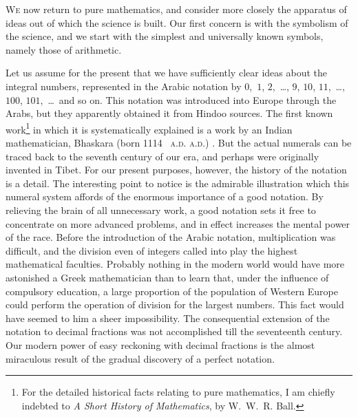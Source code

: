 \documentclass[12pt,leqno]{book}[2005/09/16]
\makeatletter
\newcommand{\Chg}[2]{#2}
\newcommand{\Add}[1]{\Chg{}{#1}}
\newcommand{\PageSep}[1]{\ignorespaces}
\newcommand{\First}[1]{\textsc{#1}}
\newcommand{\Title}[1]{\textit{#1}}
\newcommand{\SCAbbrev}[3]{%
  \ifthenelse{\equal{#3}{.}}%
  {\textsc{\MakeLowercase{#1.#2}.}}%
  {\textsc{\MakeLowercase{#1.#2}.}\@#3}%
}
\newcommand{\AD}[1]{\SCAbbrev{A}{D}{#1}}
\makeatother
\begin{document}
\First{We} now return to pure mathematics, and
consider more closely the apparatus of ideas
out of which the science is built. Our first
concern is with the symbolism of the science,
and we start with the simplest and universally
known symbols, namely those of arithmetic.

Let us assume for the present that we have
%
sufficiently clear ideas about the integral
numbers, represented in the Arabic notation
by $0$,~$1$, $2$,~\dots, $9$, $10$, $11$,~\dots\Add{,} $100$, $101$,~\dots\ and
so on. This notation was introduced into
Europe through the Arabs, but they apparently
obtained it from Hindoo sources. The
first known work\footnote
  {For the detailed historical facts relating to pure
  mathematics, I am chiefly indebted to \Title{A Short History
%
  of Mathematics}, by W.~W.~R. Ball.}
in which it is systematically
explained is a work by an Indian mathematician,
Bhaskara (born 1114~\AD). But
%
the actual numerals can be traced back to the
seventh century of our era, and perhaps were
originally invented in Tibet. For our present
\PageSep{59}
purposes, however, the history of the notation
is a detail. The interesting point to notice
is the admirable illustration which this
numeral system affords of the enormous importance
of a good notation. By relieving
the brain of all unnecessary work, a good
notation sets it free to concentrate on more
advanced problems, and in effect increases
the mental power of the race. Before the
introduction of the Arabic notation, multiplication
was difficult, and the division even of
integers called into play the highest mathematical
faculties. Probably nothing in the
modern world would have more astonished a
Greek mathematician than to learn that, under
the influence of compulsory education, a
large proportion of the population of Western
Europe could perform the operation of
division for the largest numbers. This fact
would have seemed to him a sheer impossibility.
The consequential extension of
the notation to decimal fractions was not
accomplished till the seventeenth century.
Our modern power of easy reckoning with
decimal fractions is the almost miraculous
result of the gradual discovery of a perfect
notation.
\end{document}
